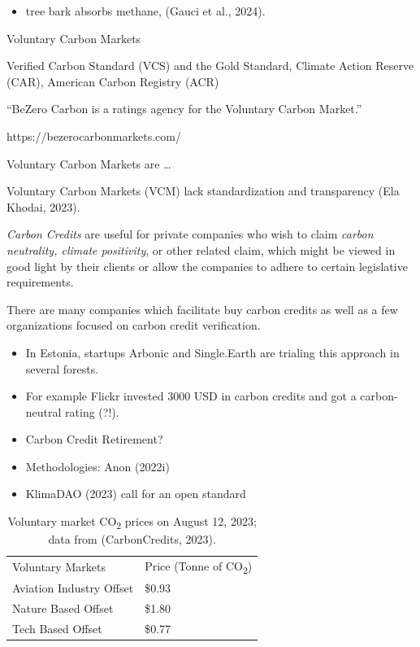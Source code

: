 \documentclass[
  letterpaper,
  DIV=11,
  numbers=noendperiod]{scrartcl}
\providecommand{\tightlist}{%
  \setlength{\itemsep}{0pt}\setlength{\parskip}{0pt}}\usepackage{longtable,booktabs,array}
\begin{document}
\begin{itemize}
\tightlist
\item
  tree bark absorbs methane, (Gauci et al., 2024).
\end{itemize}

Voluntary Carbon Markets

Verified Carbon Standard (VCS) and the Gold Standard, Climate Action
Reserve (CAR)‍, American Carbon Registry (ACR)

``BeZero Carbon is a ratings agency for the Voluntary Carbon Market.''

https://bezerocarbonmarkets.com/

Voluntary Carbon Markets are \ldots{}

Voluntary Carbon Markets (VCM) lack standardization and transparency
(Ela Khodai, 2023).

\emph{Carbon Credits} are useful for private companies who wish to claim
\emph{carbon neutrality, climate positivity}, or other related claim,
which might be viewed in good light by their clients or allow the
companies to adhere to certain legislative requirements.

There are many companies which facilitate buy carbon credits as well as
a few organizations focused on carbon credit verification.

\begin{itemize}
\tightlist
\item
  In Estonia, startups Arbonic and Single.Earth are trialing this
  approach in several forests.
\item
  For example Flickr invested 3000 USD in carbon credits and got a
  carbon-neutral rating (?!).
\item
  Carbon Credit Retirement?
\item
  Methodologies: Anon (2022i)
\item
  KlimaDAO (2023) call for an open standard
\end{itemize}

\begin{longtable}[]{@{}ll@{}}
\caption{Voluntary market CO\textsubscript{2} prices on August 12, 2023;
data from (CarbonCredits, 2023).}\tabularnewline
\toprule\noalign{}
\endfirsthead
\endhead
\bottomrule\noalign{}
\endlastfoot
Voluntary Markets & Price (Tonne of CO\textsubscript{2}) \\
Aviation Industry Offset & \$0.93 \\
Nature Based Offset & \$1.80 \\
Tech Based Offset & \$0.77 \\
\end{longtable}
\end{document}
